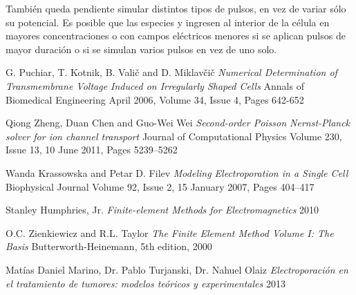 \documentclass[a4paper,10pt]{article}
\begin{document}
También queda pendiente simular distintos tipos de pulsos, en vez de variar sólo su potencial. Es posible que las especies \na y \cl ingresen \cite{lamport94} al interior de la célula en mayores concentraciones o con campos eléctricos menores si se aplican pulsos de mayor duración o si se simulan varios pulsos en vez de uno solo. \\

\begin{thebibliography}{9}


	G. Puchiar, T. Kotnik, B. Valič and D. Miklavčič
	\emph{Numerical Determination of Transmembrane Voltage Induced on Irregularly Shaped Cells}
	Annals of Biomedical Engineering
	April 2006, Volume 34, Issue 4, Pages 642-652

	Qiong Zheng, Duan Chen and Guo-Wei Wei
	\emph{Second-order Poisson Nernst-Planck solver for ion channel transport}
	Journal of Computational Physics
	Volume 230, Issue 13, 10 June 2011, Pages 5239–5262

	Wanda Krassowska and Petar D. Filev
	\emph{Modeling Electroporation in a Single Cell}
	Biophysical Journal
	Volume 92, Issue 2, 15 January 2007, Pages 404–417

	Stanley Humphries, Jr.
	\emph{Finite-element Methods for Electromagnetics}
	2010

	O.C. Zienkiewicz and R.L. Taylor
	\emph{The Finite Element Method Volume I: The Basis}
	Butterworth-Heinemann,
	5th edition,
	2000

	Matías Daniel Marino, Dr. Pablo Turjanski, Dr. Nahuel Olaiz
	\emph{Electroporación en el tratamiento de tumores: modelos teóricos y experimentales}
	2013

\end{thebibliography}
\end{document}
